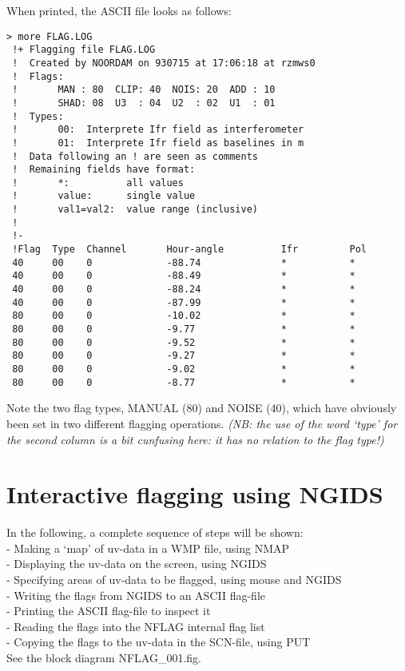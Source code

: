 When printed, the ASCII file looks as follows:

\begin{verbatim}
> more FLAG.LOG
 !+ Flagging file FLAG.LOG
 !  Created by NOORDAM on 930715 at 17:06:18 at rzmws0
 !  Flags:
 !       MAN : 80  CLIP: 40  NOIS: 20  ADD : 10
 !       SHAD: 08  U3  : 04  U2  : 02  U1  : 01
 !  Types:
 !       00:  Interprete Ifr field as interferometer
 !       01:  Interprete Ifr field as baselines in m
 !  Data following an ! are seen as comments
 !  Remaining fields have format:
 !       *:          all values
 !       value:      single value
 !       val1=val2:  value range (inclusive)
 !
 !-
 !Flag  Type  Channel       Hour-angle          Ifr         Pol
 40     00    0             -88.74              *           *
 40     00    0             -88.49              *           *
 40     00    0             -88.24              *           *
 40     00    0             -87.99              *           *
 80     00    0             -10.02              *           *
 80     00    0             -9.77               *           *
 80     00    0             -9.52               *           *
 80     00    0             -9.27               *           *
 80     00    0             -9.02               *           *
 80     00    0             -8.77               *           *
\end{verbatim}

Note the two flag types, MANUAL (80) and NOISE (40), which have obviously been
set in two different flagging operations.
{\it (NB: the use of the word `type' for the second column is a bit cunfusing
here: it has no relation to the flag type!)}


\newpage
\section{Interactive flagging using NGIDS}
\label{.interactive}

In the following, a complete sequence of steps will be shown:
~\\ - Making a `map' of uv-data in a WMP file, using NMAP
~\\ - Displaying the uv-data on the screen, using NGIDS
~\\ - Specifying areas of uv-data to be flagged, using mouse and NGIDS
~\\ - Writing the flags from NGIDS to an ASCII flag-file
~\\ - Printing the ASCII flag-file to inspect it
~\\ - Reading the flags into the NFLAG internal flag list
~\\ - Copying the flags to the uv-data in the SCN-file, using PUT
~\\ See the block diagram NFLAG\_001.fig.

